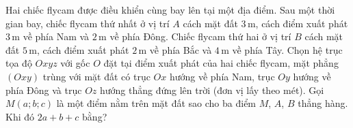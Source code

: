 \begin{bt}%
	Hai chiếc flycam được điều khiển cùng bay lên tại một địa điểm. Sau một thời gian bay, chiếc flycam thứ nhất ở vị trí $A$ cách mặt đất $3\,$m, cách điểm xuất phát $3\,$m về phía Nam và $2\,$m về phía Đông. Chiếc flycam thứ hai ở vị trí $B$ cách mặt đất $5\,$m, cách điểm xuất phát $2\,$m về phía Bắc và $4\,$m về phía Tây. Chọn hệ trục tọa độ $Oxyz$ với gốc $O$ đặt tại điểm xuất phát của hai chiếc flycam, mặt phẳng $(Oxy)$ trùng với mặt đất có trục $Ox$ hướng về phía Nam, trục $Oy$ hướng về phía Đông và trục $Oz$ hướng thẳng đứng lên trời (đơn vị lấy theo mét). Gọi $M(a;b;c)$ là một điểm nằm trên mặt đất sao cho ba điểm $M$, $A$, $B$ thẳng hàng. Khi đó $2a+b+c$ bằng?
\end{bt}

